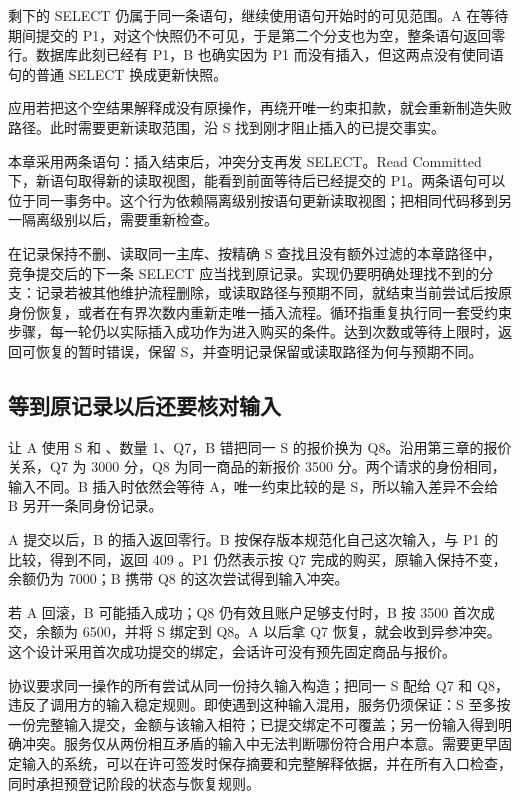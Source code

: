 剩下的 SELECT 仍属于同一条语句，继续使用语句开始时的可见范围。A 在等待期间提交的 P1，对这个快照仍不可见，于是第二个分支也为空，整条语句返回零行。数据库此刻已经有 P1，B 也确实因为 P1 而没有插入，但这两点没有使同语句的普通 SELECT 换成更新快照。



应用若把这个空结果解释成没有原操作，再绕开唯一约束扣款，就会重新制造失败路径。此时需要更新读取范围，沿 S 找到刚才阻止插入的已提交事实。

本章采用两条语句：插入结束后，冲突分支再发 SELECT。Read Committed 下，新语句取得新的读取视图，能看到前面等待后已经提交的 P1。两条语句可以位于同一事务中。这个行为依赖隔离级别按语句更新读取视图；把相同代码移到另一隔离级别以后，需要重新检查。

在记录保持不删、读取同一主库、按精确 S 查找且没有额外过滤的本章路径中，竞争提交后的下一条 SELECT 应当找到原记录。实现仍要明确处理找不到的分支：记录若被其他维护流程删除，或读取路径与预期不同，就结束当前尝试后按原身份恢复，或者在有界次数内重新走唯一插入流程。循环指重复执行同一套受约束步骤，每一轮仍以实际插入成功作为进入购买的条件。达到次数或等待上限时，返回可恢复的暂时错误，保留 S，并查明记录保留或读取路径为何与预期不同。

\subsection*{等到原记录以后还要核对输入}

让 A 使用 S 和 、数量 1、Q7，B 错把同一 S 的报价换为 Q8。沿用第三章的报价关系，Q7 为 3000 分，Q8 为同一商品的新报价 3500 分。两个请求的身份相同，输入不同。B 插入时依然会等待 A，唯一约束比较的是 S，所以输入差异不会给 B 另开一条同身份记录。

A 提交以后，B 的插入返回零行。B 按保存版本规范化自己这次输入，与 P1 的  比较，得到不同，返回 409 。P1 仍然表示按 Q7 完成的购买，原输入保持不变，余额仍为 7000；B 携带 Q8 的这次尝试得到输入冲突。



若 A 回滚，B 可能插入成功；Q8 仍有效且账户足够支付时，B 按 3500 首次成交，余额为 6500，并将 S 绑定到 Q8。A 以后拿 Q7 恢复，就会收到异参冲突。这个设计采用首次成功提交的绑定，会话许可没有预先固定商品与报价。

协议要求同一操作的所有尝试从同一份持久输入构造；把同一 S 配给 Q7 和 Q8，违反了调用方的输入稳定规则。即使遇到这种输入混用，服务仍须保证：S 至多按一份完整输入提交，金额与该输入相符；已提交绑定不可覆盖；另一份输入得到明确冲突。服务仅从两份相互矛盾的输入中无法判断哪份符合用户本意。需要更早固定输入的系统，可以在许可签发时保存摘要和完整解释依据，并在所有入口检查，同时承担预登记阶段的状态与恢复规则。

